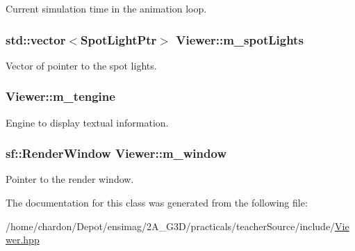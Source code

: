 Current simulation time in the animation loop. \hypertarget{classViewer_ad241b9648367de46033672b4a759cfd3}{
\subsubsection[{m\+\_\+spot\+Lights}]{\setlength{\rightskip}{0pt plus 5cm}std\+::vector$<${\bf Spot\+Light\+Ptr}$>$ Viewer\+::m\+\_\+spot\+Lights\hspace{0.3cm}{\ttfamily [private]}}}\label{classViewer_ad241b9648367de46033672b4a759cfd3}
Vector of pointer to the spot lights. \hypertarget{classViewer_a502511db306be04271e6469fc2b2d908}{
\subsubsection[{m\+\_\+tengine}]{ Viewer\+::m\+\_\+tengine\hspace{0.3cm}{\ttfamily [private]}}}\label{classViewer_a502511db306be04271e6469fc2b2d908}
Engine to display textual information. \hypertarget{classViewer_a02691cb0b474e4afc22bea4e6154a83f}{
\subsubsection[{m\+\_\+window}]{\setlength{\rightskip}{0pt plus 5cm}sf\+::\+Render\+Window Viewer\+::m\+\_\+window\hspace{0.3cm}{\ttfamily [private]}}}\label{classViewer_a02691cb0b474e4afc22bea4e6154a83f}
Pointer to the render window. 

The documentation for this class was generated from the following file\+:\begin{DoxyCompactItemize}
\item 
/home/chardon/\+Depot/ensimag/2\+A\+\_\+\+G3\+D/practicals/teacher\+Source/include/\hyperlink{Viewer_8hpp}{Viewer.\+hpp}\end{DoxyCompactItemize}
